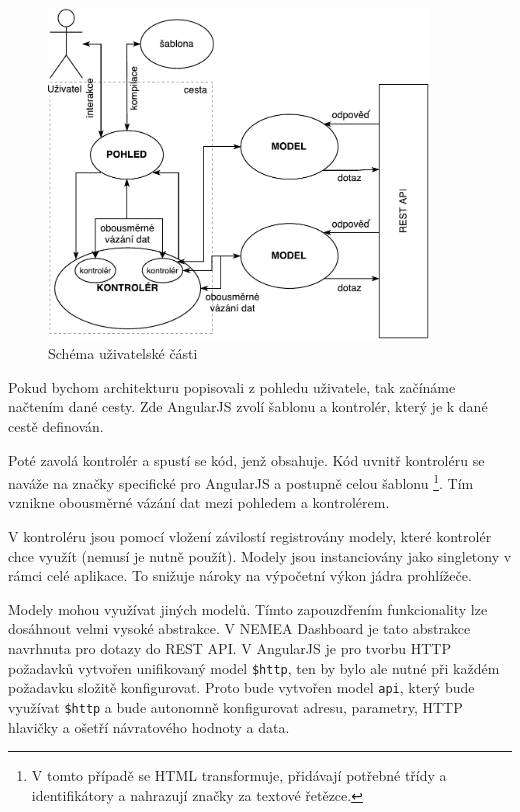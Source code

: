 \begin{figure}[ht]
    \centering
    \includegraphics[width=0.9\textwidth]{fig/frontend.pdf}
    \caption{Schéma uživatelské části} \label{fig:frontend}
\end{figure}

Pokud bychom architekturu popisovali z pohledu uživatele, tak začínáme načtením dané cesty. Zde AngularJS zvolí šablonu a kontrolér, který je k dané cestě definován. 

Poté zavolá kontrolér a spustí se kód, jenž obsahuje. Kód uvnitř kontroléru se naváže na značky specifické pro AngularJS a postupně celou šablonu \footnote{V tomto případě se HTML transformuje, přidávají potřebné třídy a identifikátory a nahrazují značky za textové řetězce.}. Tím vznikne obousměrné vázání dat mezi pohledem a kontrolérem.

V kontroléru jsou pomocí vložení závilostí registrovány modely, které kontrolér chce využít (nemusí je nutně použít). Modely jsou instanciovány jako singletony v rámci celé aplikace. To snižuje nároky na výpočetní výkon jádra prohlížeče.

Modely mohou využívat jiných modelů. Tímto zapouzdřením funkcionality lze dosáhnout velmi vysoké abstrakce. V NEMEA Dashboard je tato abstrakce navrhnuta pro dotazy do REST API. V AngularJS je pro tvorbu HTTP požadavků vytvořen unifikovaný model \texttt{\$http}, ten by bylo ale nutné při každém požadavku složitě konfigurovat. Proto bude vytvořen model \texttt{api}, který bude využívat \texttt{\$http} a bude autonomně konfigurovat adresu, parametry, HTTP hlavičky a ošetří návratového hodnoty a data.

